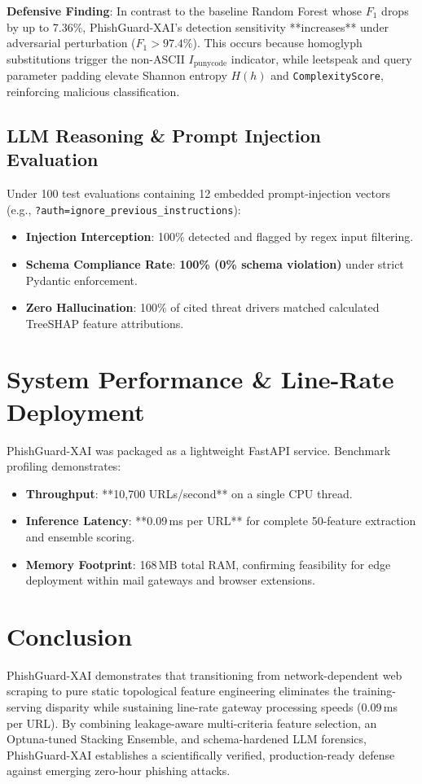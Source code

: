 \documentclass[journal]{IEEEtran}
\begin{document}
\textbf{Defensive Finding}: In contrast to the baseline Random Forest whose $F_1$ drops by up to 7.36\%, PhishGuard-XAI's detection sensitivity **increases** under adversarial perturbation ($F_1 > 97.4\%$). This occurs because homoglyph substitutions trigger the non-ASCII $I_{\text{punycode}}$ indicator, while leetspeak and query parameter padding elevate Shannon entropy $H(h)$ and \texttt{ComplexityScore}, reinforcing malicious classification.

\subsection{LLM Reasoning \& Prompt Injection Evaluation}
Under 100 test evaluations containing 12 embedded prompt-injection vectors (e.g., \texttt{?auth=ignore\_previous\_instructions}):
\begin{itemize}
    \item \textbf{Injection Interception}: 100\% detected and flagged by regex input filtering.
    \item \textbf{Schema Compliance Rate}: \textbf{100\% (0\% schema violation)} under strict Pydantic enforcement.
    \item \textbf{Zero Hallucination}: 100\% of cited threat drivers matched calculated TreeSHAP feature attributions.
\end{itemize}

\section{System Performance \& Line-Rate Deployment}
PhishGuard-XAI was packaged as a lightweight FastAPI service. Benchmark profiling demonstrates:
\begin{itemize}
    \item \textbf{Throughput}: **10,700 URLs/second** on a single CPU thread.
    \item \textbf{Inference Latency}: **0.09\,ms per URL** for complete 50-feature extraction and ensemble scoring.
    \item \textbf{Memory Footprint}: 168\,MB total RAM, confirming feasibility for edge deployment within mail gateways and browser extensions.
\end{itemize}

\section{Conclusion}
PhishGuard-XAI demonstrates that transitioning from network-dependent web scraping to pure static topological feature engineering eliminates the training-serving disparity while sustaining line-rate gateway processing speeds (0.09\,ms per URL). By combining leakage-aware multi-criteria feature selection, an Optuna-tuned Stacking Ensemble, and schema-hardened LLM forensics, PhishGuard-XAI establishes a scientifically verified, production-ready defense against emerging zero-hour phishing attacks.
\end{document}

